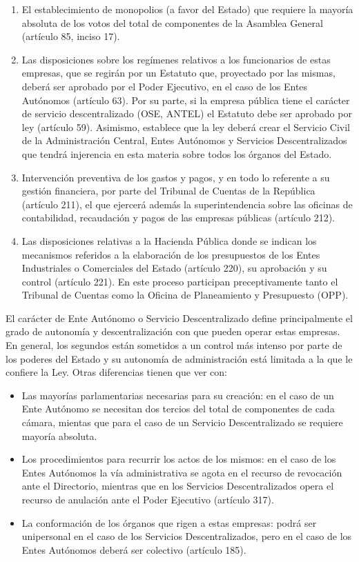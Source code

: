 \documentclass[
  12pt,
  spanish,
]{book}
\providecommand{\tightlist}{%
  \setlength{\itemsep}{0pt}\setlength{\parskip}{0pt}}
\begin{document}
\begin{enumerate}
\def\labelenumi{\arabic{enumi}.}
\item
  El establecimiento de monopolios (a favor del Estado) que requiere la mayoría absoluta de los votos del total de componentes de la Asamblea General (artículo 85, inciso 17).
\item
  Las disposiciones sobre los regímenes relativos a los funcionarios de estas empresas, que se regirán por un Estatuto que, proyectado por las mismas, deberá ser aprobado por el Poder Ejecutivo, en el caso de los Entes Autónomos (artículo 63). Por su parte, si la empresa pública tiene el carácter de servicio descentralizado (OSE, ANTEL) el Estatuto debe ser aprobado por ley (artículo 59). Asimismo, establece que la ley deberá crear el Servicio Civil de la Administración Central, Entes Autónomos y Servicios Descentralizados que tendrá injerencia en esta materia sobre todos los órganos del Estado.
\item
  Intervención preventiva de los gastos y pagos, y en todo lo referente a su gestión financiera, por parte del Tribunal de Cuentas de la República (artículo 211), el que ejercerá además la superintendencia sobre las oficinas de contabilidad, recaudación y pagos de las empresas públicas (artículo 212).
\item
  Las disposiciones relativas a la Hacienda Pública donde se indican los mecanismos referidos a la elaboración de los presupuestos de los Entes Industriales o Comerciales del Estado (artículo 220), su aprobación y su control (artículo 221). En este proceso participan preceptivamente tanto el Tribunal de Cuentas como la Oficina de Planeamiento y Presupuesto (OPP).
\end{enumerate}

El carácter de Ente Autónomo o Servicio Descentralizado define principalmente el grado de autonomía y descentralización con que pueden operar estas empresas. En general, los segundos están sometidos a un control más intenso por parte de los poderes del Estado y su autonomía de administración está limitada a la que le confiere la Ley. Otras diferencias tienen que ver con:

\begin{itemize}
\tightlist
\item
  Las mayorías parlamentarias necesarias para su creación: en el caso de un Ente Autónomo se necesitan dos tercios del total de componentes de cada cámara, mientas que para el caso de un Servicio Descentralizado se requiere mayoría absoluta.
\item
  Los procedimientos para recurrir los actos de los mismos: en el caso de los Entes Autónomos la vía administrativa se agota en el recurso de revocación ante el Directorio, mientras que en los Servicios Descentralizados opera el recurso de anulación ante el Poder Ejecutivo (artículo 317).
\item
  La conformación de los órganos que rigen a estas empresas: podrá ser unipersonal en el caso de los Servicios Descentralizados, pero en el caso de los Entes Autónomos deberá ser colectivo (artículo 185).
\end{itemize}
\end{document}

